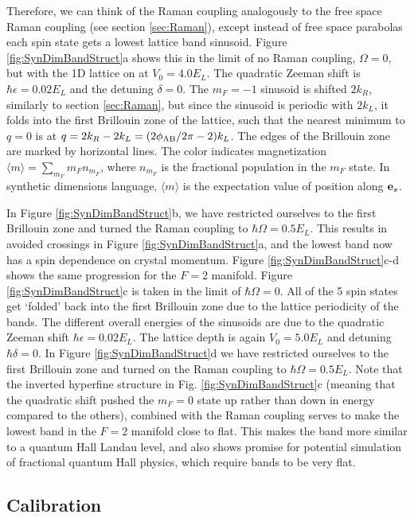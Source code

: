 Therefore, we can think of the Raman coupling analogously to the free space Raman coupling (see section \ref{sec:Raman}), except instead of free space parabolas each spin state gets a lowest lattice band sinusoid.   Figure \ref{fig:SynDimBandStruct}a shows this in the limit of no Raman coupling, $\Omega=0$, but with the 1D lattice on at $V_0=4.0 E_L$. The quadratic Zeeman shift is $\hbar\epsilon=0.02 E_L$ and the detuning $\delta=0$. The $m_F=-1$ sinusoid is shifted $2k_R$, similarly to section \ref{sec:Raman}, but since the sinusoid is periodic with $2k_L$, it folds into the first Brillouin zone of the lattice, such that the nearest minimum to $q=0$ is at $q = 2k_R-2k_L = (2\phi_{\rm AB}/2\pi - 2)k_L$. The edges of the Brillouin zone are marked by horizontal lines. The color indicates magnetization $\langle m\rangle=\sum_{m_F}m_F n_{m_F}$, where $n_{m_F}$ is the fractional population in the $m_F$ state. In synthetic dimensions language, $\langle m \rangle$ is the expectation value of position along $\textbf{e}_s{}$.

In Figure \ref{fig:SynDimBandStruct}b, we have restricted ourselves to the first Brillouin zone and turned the Raman coupling to $\hbar\Omega = 0.5 E_L$. This results in avoided crossings in Figure \ref{fig:SynDimBandStruct}a, and the lowest band now has a spin dependence on crystal momentum. Figure \ref{fig:SynDimBandStruct}c-d shows the same progression for the $F=2$ manifold. Figure \ref{fig:SynDimBandStruct}c is taken in the limit of $\hbar\Omega=0$. All of the 5 spin states get \lq{folded}\rq{} back into the first Brillouin zone due to the lattice periodicity of the bands. The different overall energies of the sinusoids are due to the quadratic Zeeman shift $\hbar\epsilon=0.02 E_L$. The lattice depth is again $V_0=5.0 E_L$ and detuning $\hbar\delta=0$. In Figure \ref{fig:SynDimBandStruct}d we have restricted ourselves to the first Brillouin zone and turned on the Raman coupling to $\hbar\Omega=0.5 E_L$.  Note that the inverted hyperfine structure in Fig. \ref{fig:SynDimBandStruct}c (meaning that the quadratic shift pushed the $m_F=0$ state up rather than down in energy compared to the others), combined with the Raman coupling serves to make the lowest band in the $F=2$ manifold close to flat. This makes the band more similar to a quantum Hall Landau level, and also shows promise for potential simulation of fractional quantum Hall physics, which require bands to be very flat. 


\subsection{Calibration}\label{sec:SynDimCalibration}

